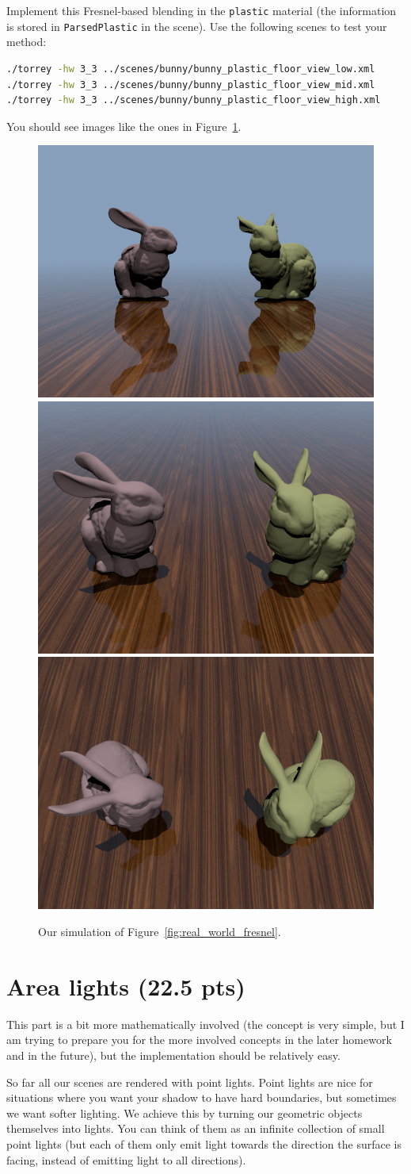 Implement this Fresnel-based blending in the \lstinline{plastic} material (the information is stored in \lstinline{ParsedPlastic} in the scene). Use the following scenes to test your method:
\begin{lstlisting}[language=bash]
./torrey -hw 3_3 ../scenes/bunny/bunny_plastic_floor_view_low.xml
./torrey -hw 3_3 ../scenes/bunny/bunny_plastic_floor_view_mid.xml
./torrey -hw 3_3 ../scenes/bunny/bunny_plastic_floor_view_high.xml
\end{lstlisting}
You should see images like the ones in Figure~\ref{fig:bunny_fresnel}.
\begin{figure}[ht]
    \centering
    \includegraphics[width=0.3\linewidth]{imgs/hw_3_3b.png}
    \includegraphics[width=0.3\linewidth]{imgs/hw_3_3c.png}
    \includegraphics[width=0.3\linewidth]{imgs/hw_3_3d.png}
    \caption{Our simulation of Figure~\ref{fig:real_world_fresnel}.}
    \label{fig:bunny_fresnel}
\end{figure}

\section{Area lights (22.5 pts)}
This part is a bit more mathematically involved (the concept is very simple, but I am trying to prepare you for the more involved concepts in the later homework and in the future), but the implementation should be relatively easy.

So far all our scenes are rendered with point lights. Point lights are nice for situations where you want your shadow to have hard boundaries, but sometimes we want softer lighting. We achieve this by turning our geometric objects themselves into lights. You can think of them as an infinite collection of small point lights (but each of them only emit light towards the direction the surface is facing, instead of emitting light to all directions).

